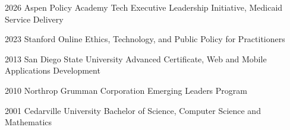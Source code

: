 \education
  {2026}
  {Aspen Policy Academy}
  {Tech Executive Leadership Initiative, Medicaid Service Delivery}

\education
  {2023}
  {Stanford Online}
  {Ethics, Technology, and Public Policy for Practitioners}

\education
  {2013}
  {San Diego State University}
  {Advanced Certificate, Web and Mobile Applications Development}

\education
  {2010}
  {Northrop Grumman Corporation}
  {Emerging Leaders Program}

\education
  {2001}
  {Cedarville University}
  {Bachelor of Science, Computer Science and Mathematics}
